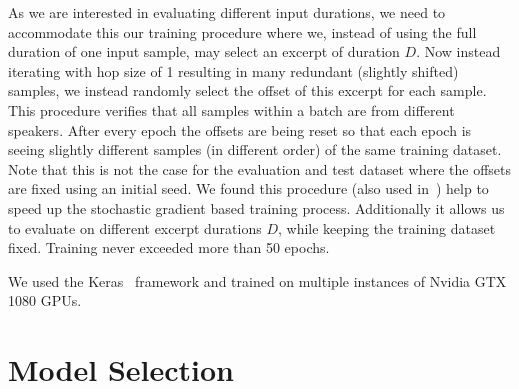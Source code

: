 As we are interested in evaluating different input durations, we need to accommodate this our training procedure where we, instead of using the full duration of one input sample, may select an excerpt of duration \(D\).
Now instead iterating with hop size of 1 resulting in many redundant (slightly shifted) samples, we instead randomly select the offset of this excerpt for each sample.
This procedure verifies that all samples within a batch are from different speakers.
After every epoch the offsets are being reset so that each epoch is seeing slightly different samples (in different order) of the same training dataset.
Note that this is not the case for the evaluation and test dataset where the offsets are fixed using an initial seed.
We found this procedure (also used in~\cite{schluter16}) help to speed up the stochastic gradient based training process.
Additionally it allows us to evaluate on different excerpt durations \(D\), while keeping the training dataset fixed.
Training never exceeded more than 50 epochs.
\par
We used the Keras~\cite{chollet15} framework and trained on multiple instances of Nvidia GTX 1080 GPUs.

\section{Model Selection}%
\label{sec:hyperparameters}
%
%

